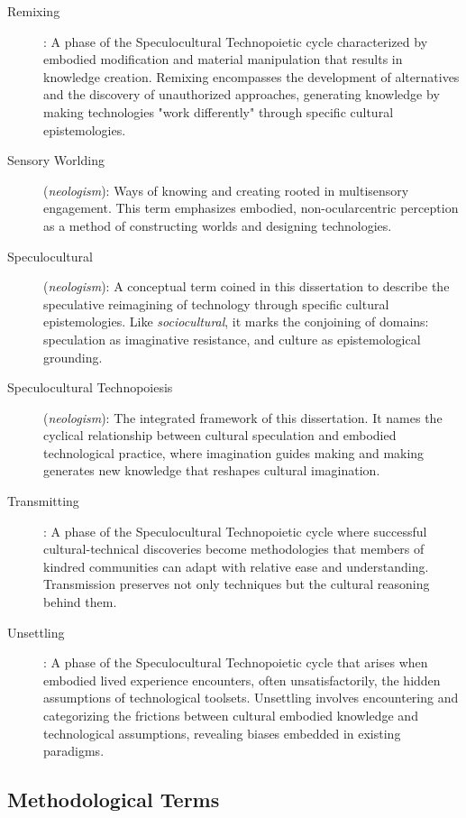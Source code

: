 \begin{description}
	\item[Remixing]: A phase of the Speculocultural Technopoietic cycle characterized by embodied modification and material manipulation that results in knowledge creation. Remixing encompasses the development of alternatives and the discovery of unauthorized approaches, generating knowledge by making technologies "work differently" through specific cultural epistemologies.
	
	\item[Sensory Worlding] (\textit{neologism}): Ways of knowing and creating rooted in multisensory engagement. This term emphasizes embodied, non-ocularcentric perception as a method of constructing worlds and designing technologies.
	
	\item[Speculocultural] (\textit{neologism}): A conceptual term coined in this dissertation to describe the speculative reimagining of technology through specific cultural epistemologies. Like \textit{sociocultural}, it marks the conjoining of domains: speculation as imaginative resistance, and culture as epistemological grounding.
	
	\item[Speculocultural Technopoiesis] (\textit{neologism}): The integrated framework of this dissertation. It names the cyclical relationship between cultural speculation and embodied technological practice, where imagination guides making and making generates new knowledge that reshapes cultural imagination.
	
	\item[Transmitting]: A phase of the Speculocultural Technopoietic cycle where successful cultural-technical discoveries become methodologies that members of kindred communities can adapt with relative ease and understanding. Transmission preserves not only techniques but the cultural reasoning behind them.
	
	\item[Unsettling]: A phase of the Speculocultural Technopoietic cycle that arises when embodied lived experience encounters, often unsatisfactorily, the hidden assumptions of technological toolsets. Unsettling involves encountering and categorizing the frictions between cultural embodied knowledge and technological assumptions, revealing biases embedded in existing paradigms.	
\end{description}

\subsection*{Methodological Terms}

